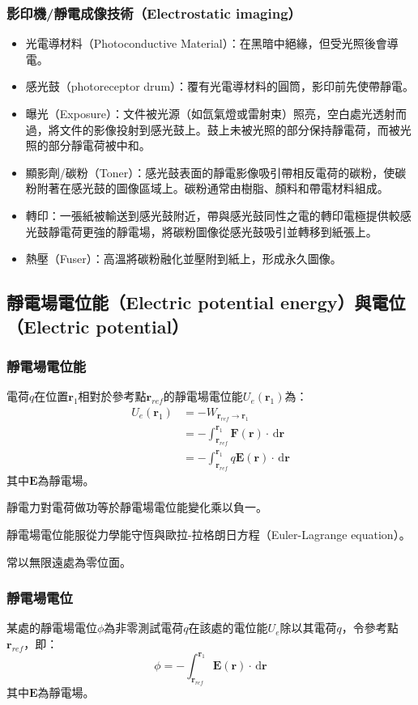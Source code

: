 \documentclass[a4paper,12pt]{report}
\begin{document}
\begin{itemize}
\subsubsection{影印機/靜電成像技術（Electrostatic imaging）}
\begin{itemize}
\item 光電導材料（Photoconductive Material）：在黑暗中絕緣，但受光照後會導電。
\item 感光鼓（photoreceptor drum）：覆有光電導材料的圓筒，影印前先使帶靜電。
\item 曝光（Exposure）：文件被光源（如氙氣燈或雷射束）照亮，空白處光透射而過，將文件的影像投射到感光鼓上。鼓上未被光照的部分保持靜電荷，而被光照的部分靜電荷被中和。
\item 顯影劑/碳粉（Toner）：感光鼓表面的靜電影像吸引帶相反電荷的碳粉，使碳粉附著在感光鼓的圖像區域上。碳粉通常由樹脂、顏料和帶電材料組成。
\item 轉印：一張紙被輸送到感光鼓附近，帶與感光鼓同性之電的轉印電極提供較感光鼓靜電荷更強的靜電場，將碳粉圖像從感光鼓吸引並轉移到紙張上。
\item 熱壓（Fuser）：高溫將碳粉融化並壓附到紙上，形成永久圖像。
\end{itemize}
\subsection{靜電場電位能（Electric potential energy）與電位（Electric potential）}
\subsubsection{靜電場電位能}
電荷$q$在位置$\mathbf{r}_1$相對於參考點$\mathbf{r}_{ref}$的靜電場電位能$U_e(\mathbf{r}_1)$為：
\[\begin{aligned}
U_e(\mathbf{r}_1) &= -W_{\mathbf{r}_{ref}\to\mathbf{r}_1}\\
&= -\int_{\mathbf{r}_{ref}}^{\mathbf{r}_1} \mathbf{F}(\mathbf{r})\cdot\,\mathrm{d}\mathbf{r}\\
&= -\int_{\mathbf{r}_{ref}}^{\mathbf{r}_1} q\mathbf{E}(\mathbf{r})\cdot\,\mathrm{d}\mathbf{r}
\end{aligned}\]
其中$\mathbf{E}$為靜電場。

靜電力對電荷做功等於靜電場電位能變化乘以負一。

靜電場電位能服從力學能守恆與歐拉-拉格朗日方程（Euler-Lagrange equation）。

常以無限遠處為零位面。
\subsubsection{靜電場電位}
某處的靜電場電位$\phi$為非零測試電荷$q$在該處的電位能$U_e$除以其電荷$q$，令參考點$\mathbf{r}_{ref}$，即：
\[\phi=-\int_{\mathbf{r}_{ref}}^{\mathbf{r}_1} \mathbf{E}(\mathbf{r})\cdot\,\mathrm{d}\mathbf{r}\]
其中$\mathbf{E}$為靜電場。


\end{itemize}
\end{document}
